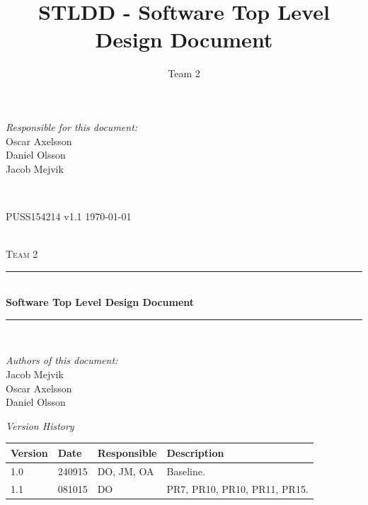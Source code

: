 \documentclass[a4paper]{article}
\title{STLDD - Software Top Level Design Document}
\author{Team 2}
\begin{document}
	\begin{titlepage}
		\newcommand{\HRule}{\rule{\linewidth}{0.5mm}}
		
		\begin{minipage}{0.5\textwidth}
			\begin{flushleft} %
				\textit{Responsible for this document:}\\
				Oscar Axelsson \\
				Daniel Olsson \\
				Jacob Mejvik
			\end{flushleft}
		\end{minipage}
		~
		\begin{minipage}{0.4\textwidth}
			\begin{flushright}
				PUSS154214 v1.1
				\today
			\end{flushright}
		\end{minipage}\\[3cm]
		
		\centering
		\textsc{\LARGE Team 2}\\[0.5cm]
		
		\HRule \\[0.4cm]
		{ \huge \bfseries Software Top Level Design Document}\\[0.4cm] %
		\HRule \\[1.5cm]
		
		\vfill
		\begin{flushleft}
			\textit{Authors of this document:}\\
			Jacob Mejvik \\
			Oscar Axelsson \\
			Daniel Olsson
		\end{flushleft}
		
	\end{titlepage}
	\setcounter{tocdepth}{2}
	
	\begin{center}
		\textit{\large Version History}
		
		\begin{tabular}{ | l | l | l | p{5cm} |}
			\hline
			\textbf{Version} 	& \textbf{Date} 	& \textbf{Responsible} 	& \textbf{Description} 		\\ \hline
			1.0				 	& 240915 			& DO, JM, OA			&  Baseline. 				\\ \hline
			1.1 			 	& 081015 			& DO					&  PR7, PR10, PR10, PR11, PR15. \\ \hline			
		\end{tabular}
	\end{center}
	
\end{document}
